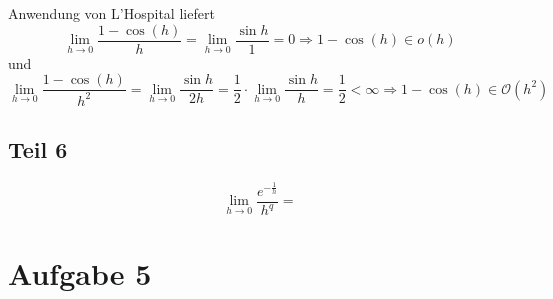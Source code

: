 \documentclass[10pt,a4paper]{article}
\begin{document}
Anwendung von L'Hospital liefert
\begin{equation}
  \lim_{h \rightarrow 0} \frac{1 - \cos(h)}{h} = \lim_{h \rightarrow 0} \frac{\sin h}{1} = 0 \Rightarrow 1 - \cos(h) \in o(h)
\end{equation}
und
\begin{equation}
  \lim_{h \rightarrow 0} \frac{1 - \cos(h)}{h^{2}} = \lim_{h \rightarrow 0} \frac{\sin h}{2h} = \frac{1}{2} \cdot \lim_{h \rightarrow 0} \frac{\sin h}{h} = \frac{1}{2} < \infty \Rightarrow 1 - \cos(h) \in \mathcal{O}(h^{2})
\end{equation}

\subsection{Teil 6}

\begin{equation}
  \lim_{h \rightarrow 0} \frac{e^{-\frac{1}{h}}}{h^{q}} =
\end{equation}

\section{Aufgabe 5}
\end{document}
